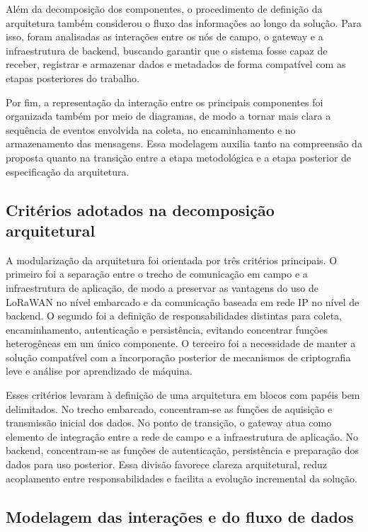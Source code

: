 Além da decomposição dos componentes, o procedimento de definição da arquitetura também considerou o fluxo das informações ao longo da solução. Para isso, foram analisadas as interações entre os nós de campo, o gateway e a infraestrutura de backend, buscando garantir que o sistema fosse capaz de receber, registrar e armazenar dados e metadados de forma compatível com as etapas posteriores do trabalho.

Por fim, a representação da interação entre os principais componentes foi organizada também por meio de diagramas, de modo a tornar mais clara a sequência de eventos envolvida na coleta, no encaminhamento e no armazenamento das mensagens. Essa modelagem auxilia tanto na compreensão da proposta quanto na transição entre a etapa metodológica e a etapa posterior de especificação da arquitetura.

\subsection{Critérios adotados na decomposição arquitetural}

A modularização da arquitetura foi orientada por três critérios principais. O primeiro foi a separação entre o trecho de comunicação em campo e a infraestrutura de aplicação, de modo a preservar as vantagens do uso de LoRaWAN no nível embarcado e da comunicação baseada em rede IP no nível de backend. O segundo foi a definição de responsabilidades distintas para coleta, encaminhamento, autenticação e persistência, evitando concentrar funções heterogêneas em um único componente. O terceiro foi a necessidade de manter a solução compatível com a incorporação posterior de mecanismos de criptografia leve e análise por aprendizado de máquina.

Esses critérios levaram à definição de uma arquitetura em blocos com papéis bem delimitados. No trecho embarcado, concentram-se as funções de aquisição e transmissão inicial dos dados. No ponto de transição, o gateway atua como elemento de integração entre a rede de campo e a infraestrutura de aplicação. No backend, concentram-se as funções de autenticação, persistência e preparação dos dados para uso posterior. Essa divisão favorece clareza arquitetural, reduz acoplamento entre responsabilidades e facilita a evolução incremental da solução.

\subsection{Modelagem das interações e do fluxo de dados}

